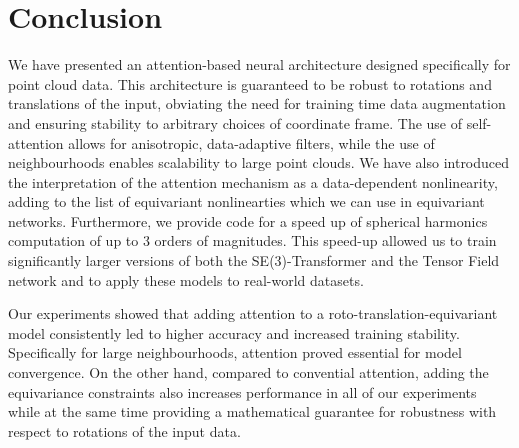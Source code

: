 \section{Conclusion}
\vspace{-1mm}
We have presented an attention-based neural architecture designed specifically for point cloud data. This architecture is guaranteed to be robust to rotations and translations of the input, obviating the need for training time data augmentation and ensuring stability to arbitrary choices of coordinate frame. The use of self-attention allows for anisotropic, data-adaptive filters, while the use of neighbourhoods enables scalability to large point clouds. We have also introduced the interpretation of the attention mechanism as a data-dependent nonlinearity, adding to the list of equivariant nonlinearties which we can use in equivariant networks. Furthermore, we provide code for a speed up of spherical harmonics computation of up to 3 orders of magnitudes. This speed-up allowed us to train significantly larger versions of both the SE(3)-Transformer and the Tensor Field network \citep{ThomasSKYKR18} and to apply these models to real-world datasets.

Our experiments showed that adding attention to a roto-translation-equivariant model consistently led to higher accuracy and increased training stability. Specifically for large neighbourhoods, attention proved essential for model convergence. On the other hand, compared to convential attention, adding the equivariance constraints also increases performance in all of our experiments while at the same time providing a mathematical guarantee for robustness with respect to rotations of the input data.



